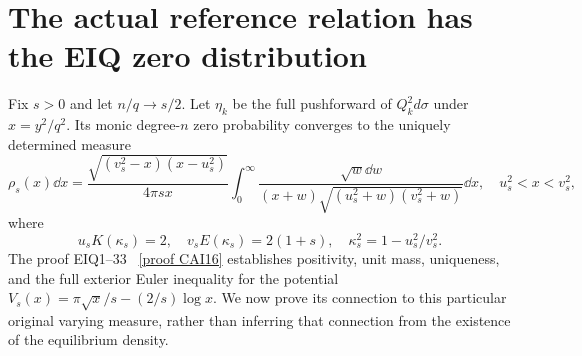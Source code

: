 \documentclass[11pt]{article}
\begin{document}
\section{The actual reference relation has the EIQ zero distribution}
Fix $s>0$ and let $n/q\to s/2$. Let $\eta_k$ be the full pushforward
of $Q_k^2d\sigma$ under $x=y^2/q^2$. Its monic degree-$n$ zero
probability converges to the uniquely determined measure
\begin{equation}\tag{NG10}
 \rho_s(x)\dd x=
 \frac{\sqrt{(v_s^2-x)(x-u_s^2)}}{4\pi s x}
 \int_0^\infty\frac{\sqrt w\dd w}
 {(x+w)\sqrt{(u_s^2+w)(v_s^2+w)}}\dd x,
 \quad u_s^2<x<v_s^2,
\end{equation}
where
\begin{equation}\tag{NG11}
 u_sK(\kappa_s)=2,\quad v_sE(\kappa_s)=2(1+s),
 \quad \kappa_s^2=1-u_s^2/v_s^2.
\end{equation}
The proof EIQ1--33 \cite{cumulative}%
~\href{https://github.com/KokunoYumeto/zeta-function-research-reader/blob/5992ad50c0f2a06921f1fcaded7b4e38097c0739/workbenches/splitzero-tandem/continuations/20260920-original-kernel-mixed-determinants/cumulative/09_UPDATED_JOINT_NOTE.tex\#L63199}{[proof CAI16]}%
{} establishes positivity, unit mass,
uniqueness, and the full exterior Euler inequality for the potential
$V_s(x)=\pi\sqrt x/s-(2/s)\log x$. We now prove its connection to
this particular original varying measure, rather than inferring that
connection from the existence of the equilibrium density.
\end{document}
